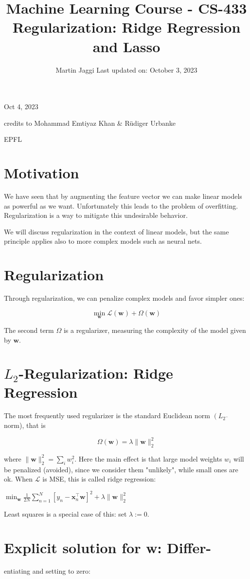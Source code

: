 \documentclass[10pt]{article}
\title{Machine Learning Course - CS-433 Regularization: Ridge Regression and Lasso }
\author{Martin Jaggi Last updated on: October 3, 2023}
\date{}
\begin{document}
\maketitle
Oct 4, 2023

credits to Mohammad Emtiyaz Khan \& Rüdiger Urbanke

EPFL

\section*{Motivation}
We have seen that by augmenting the feature vector we can make linear models as powerful as we want. Unfortunately this leads to the problem of overfitting. Regularization is a way to mitigate this undesirable behavior.

We will discuss regularization in the context of linear models, but the same principle applies also to more complex models such as neural nets.

\section*{Regularization}
Through regularization, we can penalize complex models and favor simpler ones:

$$
\min _{\mathbf{w}} \mathcal{L}(\mathbf{w})+\Omega(\mathbf{w})
$$

The second term $\Omega$ is a regularizer, measuring the complexity of the model given by $\mathbf{w}$.

\section*{$L_{2}$-Regularization: Ridge Regression}
The most frequently used regularizer is the standard Euclidean norm $\left(L_{2^{-}}\right.$ norm), that is

$$
\Omega(\mathbf{w})=\lambda\|\mathbf{w}\|_{2}^{2}
$$

where $\|\mathbf{w}\|_{2}^{2}=\sum_{i} w_{i}^{2}$. Here the main effect is that large model weights $w_{i}$ will be penalized (avoided), since we consider them "unlikely", while small ones are ok. When $\mathcal{L}$ is MSE, this is called ridge regression:

$\min _{\mathbf{w}} \frac{1}{2 N} \sum_{n=1}^{N}\left[y_{n}-\mathbf{x}_{n}^{\top} \mathbf{w}\right]^{2}+\lambda\|\mathbf{w}\|_{2}^{2}$

Least squares is a special case of this: set $\lambda:=0$.

\section*{Explicit solution for w: Differ-}
entiating and setting to zero:
\end{document}
